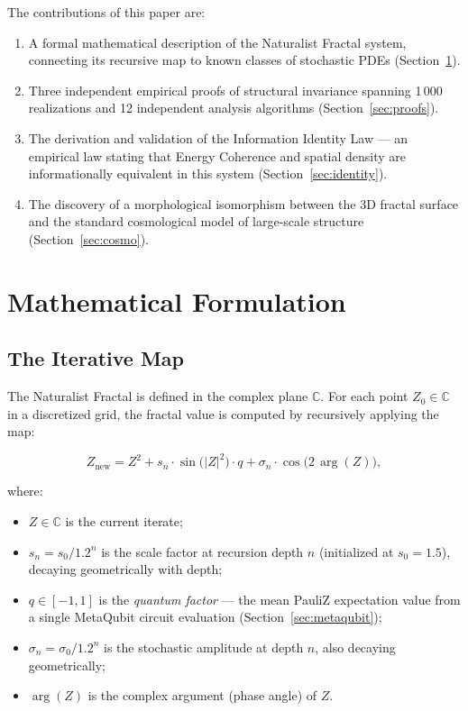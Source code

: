 \documentclass[twocolumn,amsmath,amssymb,prl]{revtex4-2}
\begin{document}
The contributions of this paper are:
\begin{enumerate}
  \item A formal mathematical description of the Naturalist Fractal system,
        connecting its recursive map to known classes of stochastic PDEs
        (Section~\ref{sec:math}).
  \item Three independent empirical proofs of structural invariance spanning
        1\,000 realizations and 12 independent analysis algorithms
        (Section~\ref{sec:proofs}).
  \item The derivation and validation of the Information Identity Law —
        an empirical law stating that Energy Coherence and spatial density
        are informationally equivalent in this system
        (Section~\ref{sec:identity}).
  \item The discovery of a morphological isomorphism between the 3D fractal
        surface and the standard cosmological model of large-scale structure
        (Section~\ref{sec:cosmo}).
\end{enumerate}

\section{Mathematical Formulation}
\label{sec:math}

\subsection{The Iterative Map}

The Naturalist Fractal is defined in the complex plane $\mathbb{C}$.
For each point $Z_0 \in \mathbb{C}$ in a discretized grid, the fractal value
is computed by recursively applying the map:

\begin{equation}
  \label{eq:core}
  Z_{\text{new}} = Z^2
    + s_n \cdot \sin\!\bigl(|Z|^2\bigr) \cdot q
    + \sigma_n \cdot \cos\!\bigl(2\,\arg(Z)\bigr),
\end{equation}

where:
\begin{itemize}
  \item $Z \in \mathbb{C}$ is the current iterate;
  \item $s_n = s_0 / 1.2^n$ is the scale factor at recursion depth $n$
        (initialized at $s_0 = 1.5$), decaying geometrically with depth;
  \item $q \in [-1,1]$ is the \emph{quantum factor} — the mean PauliZ
        expectation value from a single MetaQubit circuit evaluation
        (Section~\ref{sec:metaqubit});
  \item $\sigma_n = \sigma_0 / 1.2^n$ is the stochastic amplitude at depth
        $n$, also decaying geometrically;
  \item $\arg(Z)$ is the complex argument (phase angle) of $Z$.
\end{itemize}
\end{document}
